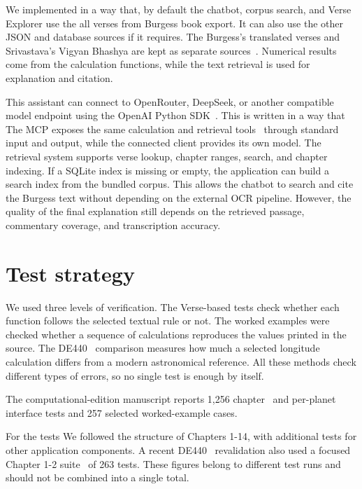 \documentclass[12pt,a4paper,oneside]{report}
\begin{document}
We implemented in a way that, by default the chatbot, corpus search, and Verse Explorer use the all verses from Burgess book export. It can also use the other JSON and database sources if it requires. The Burgess's translated verses and Srivastava's Vigyan Bhashya are kept as separate sources~\cite{burgess1860,shrivastava}. Numerical results come from the calculation functions, while the text retrieval is used for explanation and citation.

This assistant can connect to OpenRouter, DeepSeek, or another compatible model endpoint using the OpenAI Python SDK~\cite{openrouter,deepseek,openaisdk}. This is written in a way that The MCP exposes the same calculation and retrieval tools~\cite{mcp} through standard input and output, while the connected client provides its own model. The retrieval system supports verse lookup, chapter ranges, search, and chapter indexing. If a SQLite index is missing or empty, the application can build a search index from the bundled corpus. This allows the chatbot to search and cite the Burgess text without depending on the external OCR pipeline. However, the quality of the final explanation still depends on the retrieved passage, commentary coverage, and transcription accuracy.

\section{Test strategy}

We used three levels of verification. The Verse-based tests check whether each function follows the selected textual rule or not. The worked examples were checked whether a sequence of calculations reproduces the values printed in the source. The DE440~\cite{Park2021DE440} comparison measures how much a selected longitude calculation differs from a modern astronomical reference. All these methods check different types of errors, so no single test is enough by itself.

The computational-edition manuscript reports 1,256 chapter~\cite{nigam2026edition} and per-planet interface tests and 257 selected worked-example cases.

For the tests We followed the structure of Chapters 1-14, with additional tests for other application components. A recent DE440~\cite{Park2021DE440} revalidation also used a focused Chapter 1-2 suite~\cite{nigam2026de440} of 263 tests. These figures belong to different test runs and should not be combined into a single total.
\end{document}
